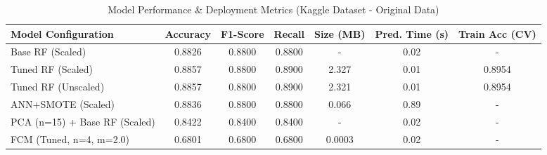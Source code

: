 \documentclass[sigconf,screen,final,nonacm]{acmart}
\begin{document}
\begin{table*}[ht]
  \caption{Model Performance \& Deployment Metrics (Kaggle Dataset - Original Data)}
  \label{tab:kaggle_results}
  \centering
  \small %
  \begin{tabular}{l S S S S[round-precision=3, table-format=1.3] S[round-precision=2, table-format=1.2] S[round-precision=4, table-format=1.4]} %
    \toprule
    \textbf{Model Configuration} & {\textbf{Accuracy}} & {\textbf{F1-Score}} & {\textbf{Recall}} & {\textbf{Size (MB)}} & {\textbf{Pred. Time (s)}} & {\textbf{Train Acc (CV)}} \\ %
    \midrule
    Base RF (Scaled)            & 0.8826 & 0.8800 & 0.8800 & {-}    & 0.02 & {-} \\ %
    Tuned RF (Scaled)           & 0.8857 & 0.8800 & 0.8900 & 2.327 & 0.01 & 0.8954 \\ %
    Tuned RF (Unscaled)         & 0.8857 & 0.8800 & 0.8900 & 2.321 & 0.01 & 0.8954 \\ %
    ANN+SMOTE (Scaled)          & 0.8836 & 0.8800 & 0.8800 & 0.066 & 0.89 & {-} \\ %
    PCA (n=15) + Base RF (Scaled) & 0.8422 & 0.8400 & 0.8400 & {-}   & 0.02 & {-} \\ %
    FCM (Tuned, n=4, m=2.0)     & 0.6801 & 0.6800 & 0.6800 & 0.0003 & 0.02 & {-} \\ %
    \bottomrule
  \end{tabular}
\end{table*}
\end{document}
